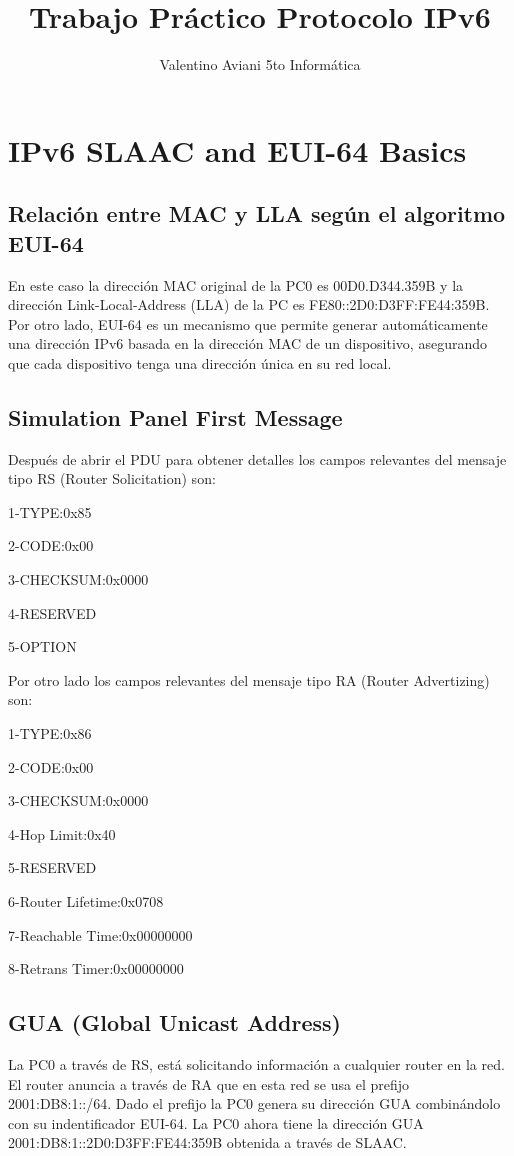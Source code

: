 \documentclass[12pt]{article}
\title{Trabajo Práctico Protocolo IPv6}
\author{Valentino Aviani 5to Informática}
\begin{document}
\maketitle

\begin{abstract}

\end{abstract}

\section{IPv6 SLAAC and EUI-64 Basics}
\subsection{Relación entre MAC y LLA según el algoritmo EUI-64}
En este caso la dirección MAC original de la PC0 es 00D0.D344.359B y la dirección Link-Local-Address (LLA) de la PC es FE80::2D0:D3FF:FE44:359B. Por otro lado, EUI-64 es un mecanismo que permite generar automáticamente una dirección IPv6 basada en la dirección MAC de un dispositivo, asegurando que cada dispositivo tenga una dirección única en su red local.
\subsection{Simulation Panel First Message}
Después de abrir el PDU para obtener detalles los campos relevantes del mensaje tipo RS (Router Solicitation) son:

1-TYPE:0x85 
 
2-CODE:0x00

3-CHECKSUM:0x0000 

4-RESERVED

5-OPTION 

Por otro lado los campos relevantes del mensaje tipo RA (Router Advertizing) son:

1-TYPE:0x86 

2-CODE:0x00

3-CHECKSUM:0x0000 

4-Hop Limit:0x40 

5-RESERVED

6-Router Lifetime:0x0708 

7-Reachable Time:0x00000000 

8-Retrans Timer:0x00000000

\subsection{GUA (Global Unicast Address)}
La PC0 a través de RS, está solicitando información a cualquier router en la red. El router anuncia a través de RA que en esta red se usa el prefijo 2001:DB8:1::/64. Dado el prefijo la PC0 genera su dirección GUA combinándolo con su indentificador EUI-64. La PC0 ahora tiene la dirección GUA 2001:DB8:1::2D0:D3FF:FE44:359B obtenida a través de SLAAC.
\end{document}
